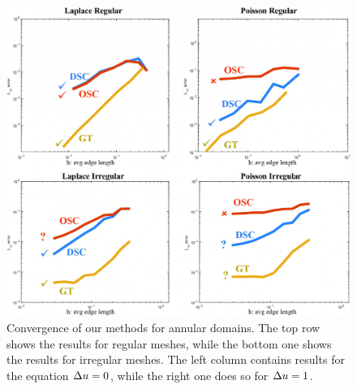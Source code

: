 \documentclass[11pt,a4paper, final, twoside]{article}
\theoremstyle{proposition}
\theoremstyle{definition}
\theoremstyle{remark}
\numberwithin{equation}{section}
\begin{document}
\begin{figure}[h]
\begin{center}
\includegraphics[width=.95\textwidth]{allfigs2.jpg}
\caption{Convergence of our methods for annular domains. The top row shows the results for regular meshes, while the bottom one shows the results for irregular meshes. The left column contains results for the equation $\Delta u=0$, while the right one does so for $\Delta u=1$.}
\label{Fig:AnnulusResults}
\end{center}
\end{figure}
\end{document}

